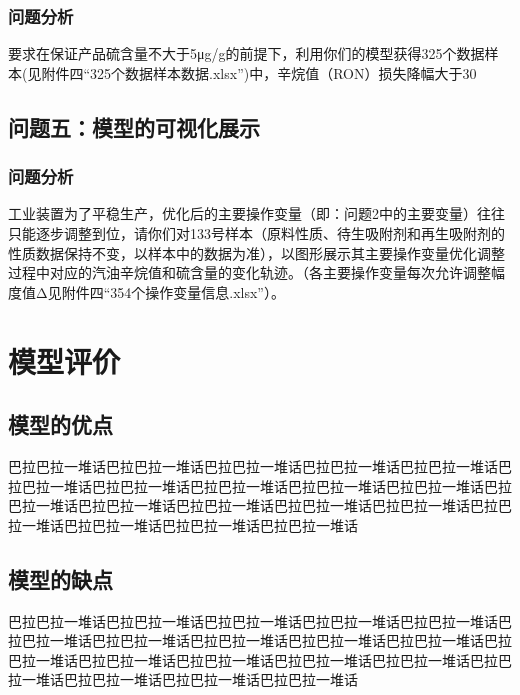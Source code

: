 \documentclass[bwprint]{gmcmthesis}
\begin{document}
\FloatBarrier
\subsubsection{问题分析}

要求在保证产品硫含量不大于5μg/g的前提下，利用你们的模型获得325个数据样本(见附件四“325个数据样本数据.xlsx”)中，辛烷值（RON）损失降幅大于30%


\subsection{问题五：模型的可视化展示}

\FloatBarrier
\subsubsection{问题分析}

工业装置为了平稳生产，优化后的主要操作变量（即：问题2中的主要变量）往往只能逐步调整到位，请你们对133号样本（原料性质、待生吸附剂和再生吸附剂的性质数据保持不变，以样本中的数据为准），以图形展示其主要操作变量优化调整过程中对应的汽油辛烷值和硫含量的变化轨迹。（各主要操作变量每次允许调整幅度值Δ见附件四“354个操作变量信息.xlsx”）。

\FloatBarrier
\section{模型评价}


\FloatBarrier
\subsection{模型的优点}
巴拉巴拉一堆话巴拉巴拉一堆话巴拉巴拉一堆话巴拉巴拉一堆话巴拉巴拉一堆话巴拉巴拉一堆话巴拉巴拉一堆话巴拉巴拉一堆话巴拉巴拉一堆话巴拉巴拉一堆话巴拉巴拉一堆话巴拉巴拉一堆话巴拉巴拉一堆话巴拉巴拉一堆话巴拉巴拉一堆话巴拉巴拉一堆话巴拉巴拉一堆话巴拉巴拉一堆话巴拉巴拉一堆话


\FloatBarrier
\subsection{模型的缺点}
巴拉巴拉一堆话巴拉巴拉一堆话巴拉巴拉一堆话巴拉巴拉一堆话巴拉巴拉一堆话巴拉巴拉一堆话巴拉巴拉一堆话巴拉巴拉一堆话巴拉巴拉一堆话巴拉巴拉一堆话巴拉巴拉一堆话巴拉巴拉一堆话巴拉巴拉一堆话巴拉巴拉一堆话巴拉巴拉一堆话巴拉巴拉一堆话巴拉巴拉一堆话巴拉巴拉一堆话巴拉巴拉一堆话
\end{document}
